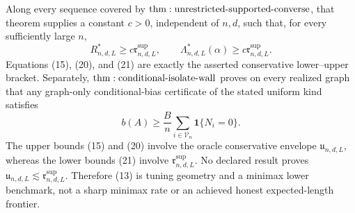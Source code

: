 Along every sequence covered by \({\rm thm:unrestricted\text{-}supported\text{-}converse}\), that theorem supplies a constant \(c>0\), independent of \(n,d\), such that, for every sufficiently large \(n\),
\[
 R^*_{n,d,L}\geq c\mathfrak r^{\mathrm{sup}}_{n,d,L},
 \qquad
 \Lambda^*_{n,d,L}(\alpha)
 \geq c\mathfrak r^{\mathrm{sup}}_{n,d,L}.
\tag{21}
\]
Equations (15), (20), and (21) are exactly the asserted conservative lower--upper bracket.  Separately, \({\rm thm:conditional\text{-}isolate\text{-}wall}\) proves on every realized graph that any graph-only conditional-bias certificate of the stated uniform kind satisfies
\[
 b(A)\geq\frac{B}{n}
 \sum_{i\in\mathcal V_n}\mathbf1\{N_i=0\}.
\tag{22}
\]
The upper bounds (15) and (20) involve the oracle conservative envelope \(\mathfrak u_{n,d,L}\), whereas the lower bounds (21) involve \(\mathfrak r^{\mathrm{sup}}_{n,d,L}\).  No declared result proves \(\mathfrak u_{n,d,L}\lesssim\mathfrak r^{\mathrm{sup}}_{n,d,L}\).  Therefore (13) is tuning geometry and a minimax lower benchmark, not a sharp minimax rate or an achieved honest expected-length frontier.